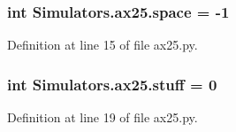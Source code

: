 \subsubsection[{space}]{\setlength{\rightskip}{0pt plus 5cm}int Simulators.\+ax25.\+space = -\/1}\label{namespace_simulators_1_1ax25_a62d8cdc4e9b178f6c1b1fc312c90c729}


Definition at line 15 of file ax25.\+py.

\hypertarget{namespace_simulators_1_1ax25_a5b4f94684090625dbe3a824ecb3c4027}{}
\subsubsection[{stuff}]{\setlength{\rightskip}{0pt plus 5cm}int Simulators.\+ax25.\+stuff = 0}\label{namespace_simulators_1_1ax25_a5b4f94684090625dbe3a824ecb3c4027}


Definition at line 19 of file ax25.\+py.

